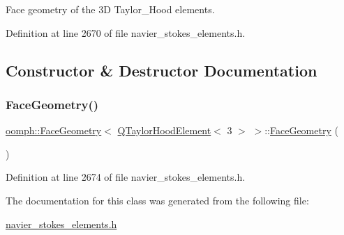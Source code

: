 Face geometry of the 3D Taylor\+\_\+\+Hood elements. 

Definition at line 2670 of file navier\+\_\+stokes\+\_\+elements.\+h.



\subsection{Constructor \& Destructor Documentation}
\mbox{\label{classoomph_1_1FaceGeometry_3_01QTaylorHoodElement_3_013_01_4_01_4_af70fe1e6c46e673849610368db48b60e}} 
\subsubsection{\texorpdfstring{Face\+Geometry()}{FaceGeometry()}}
{\footnotesize\ttfamily \hyperlink{classoomph_1_1FaceGeometry}{oomph\+::\+Face\+Geometry}$<$ \hyperlink{classoomph_1_1QTaylorHoodElement}{Q\+Taylor\+Hood\+Element}$<$ 3 $>$ $>$\+::\hyperlink{classoomph_1_1FaceGeometry}{Face\+Geometry} (\begin{DoxyParamCaption}{ }\end{DoxyParamCaption})\hspace{0.3cm}{\ttfamily [inline]}}



Definition at line 2674 of file navier\+\_\+stokes\+\_\+elements.\+h.



The documentation for this class was generated from the following file\+:\begin{DoxyCompactItemize}
\item 
\hyperlink{navier__stokes__elements_8h}{navier\+\_\+stokes\+\_\+elements.\+h}\end{DoxyCompactItemize}
